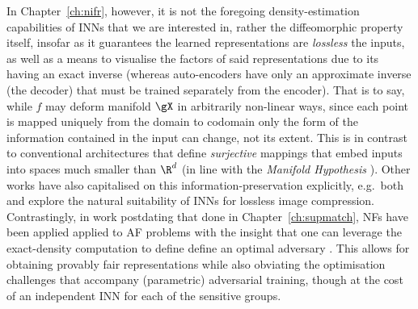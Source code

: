 %
In Chapter~\ref{ch:nifr}, however, it is not the foregoing density-estimation capabilities of INNs
that we are interested in, rather the diffeomorphic property itself, insofar as it guarantees the
learned representations are \emph{lossless} \wrt{} the inputs, as well as a means to visualise the
factors of said representations due to its having an exact inverse (whereas auto-encoders have only
an approximate inverse (the decoder) that must be trained separately from the encoder).
%
That is to say, while \(f\) may deform manifold \(\gX\) in arbitrarily non-linear ways, since each
point is mapped uniquely from the domain to codomain only the form of the information contained in
the input can change, not its extent. 
%
This is in contrast to conventional architectures that define \emph{surjective} mappings that embed
inputs into spaces much smaller than \(\R^d\) (in line with the \emph{Manifold Hypothesis}
\citep{fefferman2016testing}).
%
Other works have also capitalised on this information-preservation explicitly, e.g.\ both
\citet{hoogeboom2019integer} and \citet{xie2021enhanced} explore the natural suitability of INNs
for lossless image compression.
%
Contrastingly, in work postdating that done in Chapter~\ref{ch:supmatch}, \acp{NF} have been
applied applied to \ac{AF} problems with the insight that one can leverage the exact-density
computation to define define an optimal adversary \citep{balunovic2021fair, cerrato2022fair}. 
%
This allows for obtaining provably fair representations while also obviating the optimisation
challenges that accompany (parametric) adversarial training, though at the cost of an independent
\ac{INN} for each of the sensitive groups.

